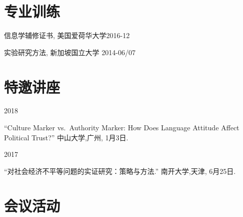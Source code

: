 \documentclass[10.5pt,]{article}
\providecommand{\tightlist}{%
	\setlength{\itemsep}{0pt}\setlength{\parskip}{0pt}}
\renewenvironment{itemize}{
	\begin{list}{}{
			\setlength{\leftmargin}{1.5em}
		}
	}{
	\end{list}
}
\begin{document}
\hypertarget{ux4e13ux4e1aux8badux7ec3}{%
\section{专业训练}\label{ux4e13ux4e1aux8badux7ec3}}

\begin{itemize}
\tightlist
\item
  信息学辅修证书, 美国爱荷华大学\hfill 2016-12
\item
  实验研究方法, 新加坡国立大学 \hfill 2014-06/07
\end{itemize}

\hypertarget{ux7279ux9080ux8bb2ux5ea7}{%
\section{特邀讲座}\label{ux7279ux9080ux8bb2ux5ea7}}

\begin{itemize}
\tightlist
\item
  2018

  \begin{itemize}
  \tightlist
  \item
    ``Culture Marker vs.~Authority Marker: How Does Language Attitude
    Affect Political Trust?'' 中山大学,广州, 1月3日.
  \end{itemize}
\item
  2017

  \begin{itemize}
  \tightlist
  \item
    ``对社会经济不平等问题的实证研究：策略与方法.'' 南开大学,天津,
    6月25日.
  \end{itemize}
\end{itemize}

\hypertarget{ux4f1aux8baeux6d3bux52a8}{%
\section{会议活动}\label{ux4f1aux8baeux6d3bux52a8}}
\end{document}
